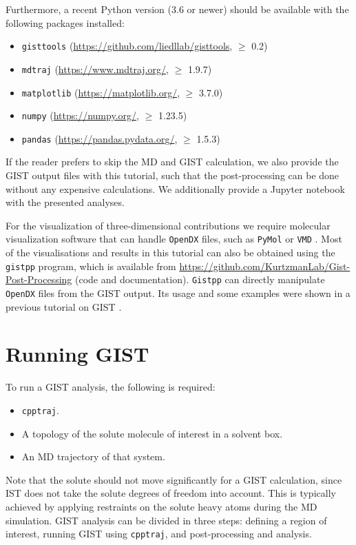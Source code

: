 \documentclass[9pt,tutorial]{livecoms}
\newcommand{\software}{\texttt}
\begin{document}
Furthermore, a recent Python version (3.6 or newer) should be available with the following packages installed:
\begin{itemize}
	\item \software{gisttools} (\url{https://github.com/liedllab/gisttools}, $\geq$ 0.2)
	\item \software{mdtraj} (\url{https://www.mdtraj.org/}, $\geq$ 1.9.7) \cite{McGibbon2015-mdtraj}
	\item \software{matplotlib} (\url{https://matplotlib.org/}, $\geq$ 3.7.0) \cite{Hunter2007-matplotlib}
	\item \software{numpy} (\url{https://numpy.org/}, $\geq$ 1.23.5) \cite{harris2020-numpy}
	\item \software{pandas} (\url{https://pandas.pydata.org/}, $\geq$ 1.5.3) \cite{pandas-2023_8239932}
\end{itemize}
If the reader prefers to skip the MD and GIST calculation, we also provide the GIST output files with this tutorial, such that the post-processing can be done without any expensive calculations.
We additionally provide a Jupyter notebook \cite{Kluyver2016-jupyter,Granger2021-jupyter} with the presented analyses. 

For the visualization of three-dimensional contributions we require molecular visualization software that can handle \software{OpenDX} files, such as \software{PyMol} \cite{pymol} or \software{VMD} \cite{vmd}.
Most of the visualisations and results in this tutorial can also be obtained using the \software{gistpp} program, which is available from \url{https://github.com/KurtzmanLab/Gist-Post-Processing} (code and documentation). \software{Gistpp} can directly manipulate \software{OpenDX} files from the GIST output. 
Its usage and some examples were shown in a previous tutorial on GIST \cite{Ramsey2016}.

\pagebreak %

\section{Running GIST}
\label{sec:running_GIST}
To run a GIST analysis, the following is required:
\begin{itemize}
	\item \software{cpptraj}.
	\item A topology of the solute molecule of interest in a solvent box.
	\item An MD trajectory of that system.
\end{itemize}
Note that the solute should not move significantly for a GIST calculation, since IST does not take the solute degrees of freedom into account.
This is typically achieved by applying restraints on the solute heavy atoms during the MD simulation.
GIST analysis can be divided in three steps: defining a region of interest, running GIST using \software{cpptraj}, and post-processing and analysis.
\cite{Ramsey2016}
\end{document}
